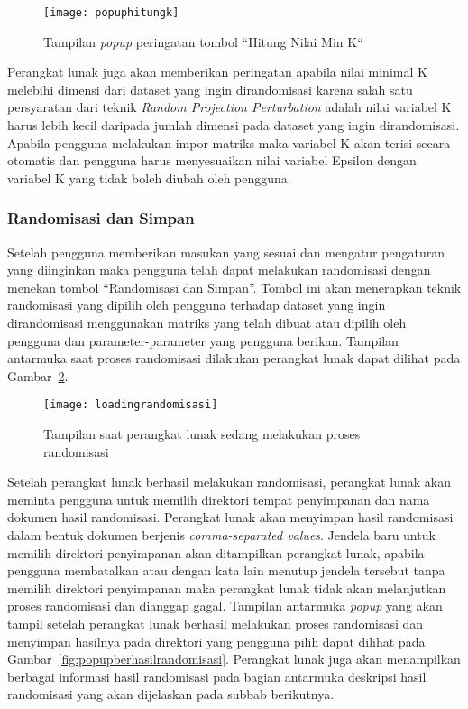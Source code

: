 \begin{figure}
	\centering
	\texttt{[image: popuphitungk]}
	\caption{Tampilan \textit{popup} peringatan tombol \textquotedblleft Hitung Nilai Min K\textquotedblleft }
	\label{fig:popuphitungk}
\end{figure}

Perangkat lunak juga akan memberikan peringatan apabila nilai minimal K melebihi dimensi dari dataset yang ingin dirandomisasi karena salah satu persyaratan dari teknik \textit{Random Projection Perturbation} adalah nilai variabel K harus lebih kecil daripada jumlah dimensi pada dataset yang ingin dirandomisasi. Apabila pengguna melakukan impor matriks maka variabel K akan terisi secara otomatis dan pengguna harus menyesuaikan nilai variabel Epsilon dengan variabel K yang tidak boleh diubah oleh pengguna. 

\subsubsection{Randomisasi dan Simpan}
\label{sec:randomisasisimpan}

Setelah pengguna memberikan masukan yang sesuai dan mengatur pengaturan yang diinginkan maka pengguna telah dapat melakukan randomisasi dengan menekan tombol \textquotedblleft Randomisasi dan Simpan\textquotedblright. Tombol ini akan menerapkan teknik randomisasi yang dipilih oleh pengguna terhadap dataset yang ingin dirandomisasi menggunakan matriks yang telah dibuat atau dipilih oleh pengguna dan parameter-parameter yang pengguna berikan. Tampilan antarmuka saat proses randomisasi dilakukan perangkat lunak dapat dilihat pada Gambar~\ref{fig:loadingrandomisasi}.

\begin{figure}
	\centering
	\texttt{[image: loadingrandomisasi]}
	\caption{Tampilan saat perangkat lunak sedang melakukan proses randomisasi}
	\label{fig:loadingrandomisasi}
\end{figure}

Setelah perangkat lunak berhasil melakukan randomisasi, perangkat lunak akan meminta pengguna untuk memilih direktori tempat penyimpanan dan nama dokumen hasil randomisasi. Perangkat lunak akan menyimpan hasil randomisasi dalam bentuk dokumen berjenis \textit{comma-separated values}. Jendela baru untuk memilih direktori penyimpanan akan ditampilkan perangkat lunak, apabila pengguna membatalkan atau dengan kata lain menutup jendela tersebut tanpa memilih direktori penyimpanan maka perangkat lunak tidak akan melanjutkan proses randomisasi dan dianggap gagal. Tampilan antarmuka \textit{popup} yang akan tampil setelah perangkat lunak berhasil melakukan proses randomisasi dan menyimpan hasilnya pada direktori yang pengguna pilih dapat dilihat pada Gambar~\ref{fig:popupberhasilrandomisasi}. Perangkat lunak juga akan menampilkan berbagai informasi hasil randomisasi pada bagian antarmuka deskripsi hasil randomisasi yang akan dijelaskan pada subbab berikutnya.


